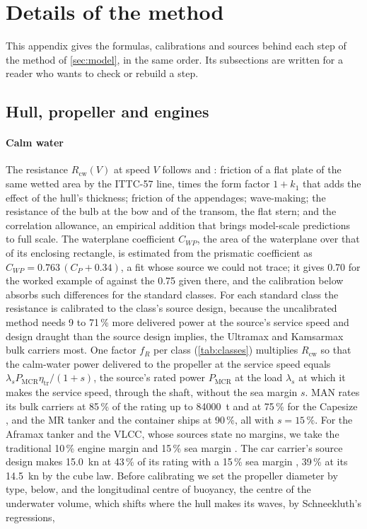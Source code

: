 \section{Details of the method}
\label{sec:method_details}

This appendix gives the formulas, calibrations and sources behind each step of the method of \cref{sec:model}, in the same order. Its subsections are written for a reader who wants to check or rebuild a step.

\subsection{Hull, propeller and engines}
\label{sec:det_ships}

\paragraph{Calm water} The resistance $R_\mathrm{cw}(V)$ at speed $V$ follows \citet{holtrop1982} and \citet{holtrop1984}: friction of a flat plate of the same wetted area by the ITTC-57 line, times the form factor $1+k_1$ that adds the effect of the hull's thickness; friction of the appendages; wave-making; the resistance of the bulb at the bow and of the transom, the flat stern; and the correlation allowance, an empirical addition that brings model-scale predictions to full scale. The waterplane coefficient $C_{WP}$, the area of the waterplane over that of its enclosing rectangle, is estimated from the prismatic coefficient as $C_{WP}=0.763\,(C_P+0.34)$, a fit whose source we could not trace; it gives 0.70 for the worked example of \citet{holtrop1982} against the 0.75 given there, and the calibration below absorbs such differences for the standard classes. For each standard class the resistance is calibrated to the class's source design, because the uncalibrated method needs 9 to 71\,\% more delivered power at the source's service speed and design draught than the source design implies, the Ultramax and Kamsarmax bulk carriers most. One factor $f_R$ per class (\cref{tab:classes}) multiplies $R_\mathrm{cw}$ so that the calm-water power delivered to the propeller at the service speed equals $\lambda_s P_\mathrm{MCR}\eta_\mathrm{tr}/(1+s)$, the source's rated power $P_\mathrm{MCR}$ at the load $\lambda_s$ at which it makes the service speed, through the shaft, without the sea margin $s$. MAN rates its bulk carriers at 85\,\% of the rating up to \num{84000}~t and at 75\,\% for the Capesize \citep{man2022bulk}, and the MR tanker \citep{man2019mr} and the container ships \citep{man2024container} at 90\,\%, all with $s=15\,\%$. For the Aframax tanker and the VLCC, whose sources state no margins, we take the traditional 10\,\% engine margin and 15\,\% sea margin \citep{man2011}. The car carrier's source design makes \SI{15.0}{kn} at 43\,\% of its rating with a 15\,\% sea margin \citep{keh_8600ceu_df_pctc}, 39\,\% at its \SI{14.5}{kn} by the cube law. Before calibrating we set the propeller diameter by type, below, and the longitudinal centre of buoyancy, the centre of the underwater volume, which shifts where the hull makes its waves, by Schneekluth's regressions, 